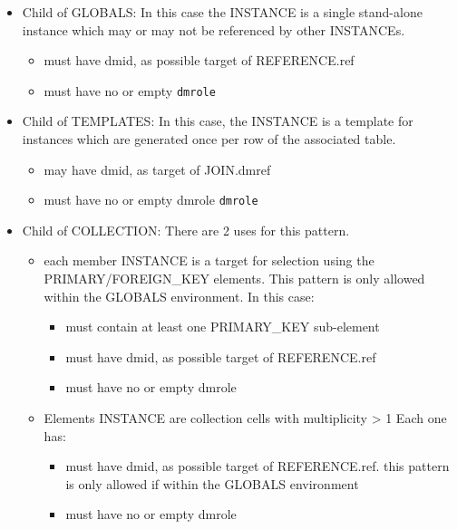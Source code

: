 \begin{itemize}
\item Child of GLOBALS:
   In this case the INSTANCE is a single stand-alone instance which
   may or may not be referenced by other INSTANCEs.
  \begin{itemize}
     \item must have dmid, as possible target of REFERENCE.ref
     \item must have no or empty \texttt{dmrole}
  \end{itemize}  
  
\item Child of TEMPLATES:
  In this case, the INSTANCE is a template for instances which
  are generated once per row of the associated table.  
  \begin{itemize}
     \item may have dmid, as target of JOIN.dmref
     \item must have no or empty dmrole \texttt{dmrole}
  \end{itemize}  
  
\item Child of COLLECTION:
  There are 2 uses for this pattern.  
  \begin{itemize}
     \item each member INSTANCE is a target for selection using
           the PRIMARY/FOREIGN\_KEY elements. This pattern is only 
           allowed within the GLOBALS environment. In this case:             
           \begin{itemize}
             \item must contain at least one PRIMARY\_KEY sub-element
             \item must have dmid, as possible target of REFERENCE.ref
             \item must have no or empty dmrole
           \end{itemize}

     \item Elements INSTANCE are collection cells with multiplicity > 1
          Each one has:             
           \begin{itemize}
             \item must have dmid, as possible target of REFERENCE.ref. 
                   this pattern is             
                   only allowed if within the GLOBALS environment
             \item must have no or empty dmrole
           \end{itemize}
    

\end{itemize}
\end{itemize}
